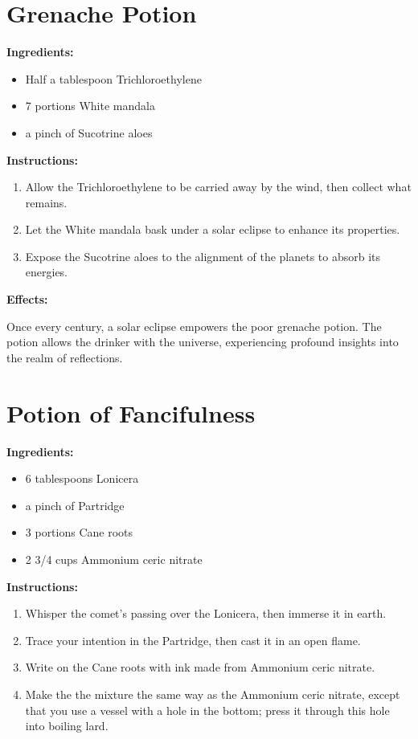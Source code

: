 \documentclass{article}
\begin{document}
\newpage
\section*{Grenache Potion}

\textbf{Ingredients:}

\begin{itemize}
  \item Half a tablespoon Trichloroethylene
  \item 7 portions White mandala
  \item a pinch of Sucotrine aloes
\end{itemize}

\textbf{Instructions:}

\begin{enumerate}
  \item Allow the Trichloroethylene to be carried away by the wind, then collect what remains.
  \item Let the White mandala bask under a solar eclipse to enhance its properties.
  \item Expose the Sucotrine aloes to the alignment of the planets to absorb its energies.
\end{enumerate}

\textbf{Effects:}

Once every century, a solar eclipse empowers the poor grenache potion. The potion allows the drinker with the universe, experiencing profound insights into the realm of reflections.

\newpage
\section*{Potion of Fancifulness}

\textbf{Ingredients:}

\begin{itemize}
  \item 6 tablespoons Lonicera
  \item a pinch of Partridge
  \item 3 portions Cane roots
  \item 2 3/4 cups Ammonium ceric nitrate
\end{itemize}

\textbf{Instructions:}

\begin{enumerate}
  \item Whisper the comet’s passing over the Lonicera, then immerse it in earth.
  \item Trace your intention in the Partridge, then cast it in an open flame.
  \item Write on the Cane roots with ink made from Ammonium ceric nitrate.
  \item Make the the mixture the same way as the Ammonium ceric nitrate, except that you use a vessel with a hole in the bottom; press it through this hole into boiling lard.
\end{enumerate}
\end{document}
